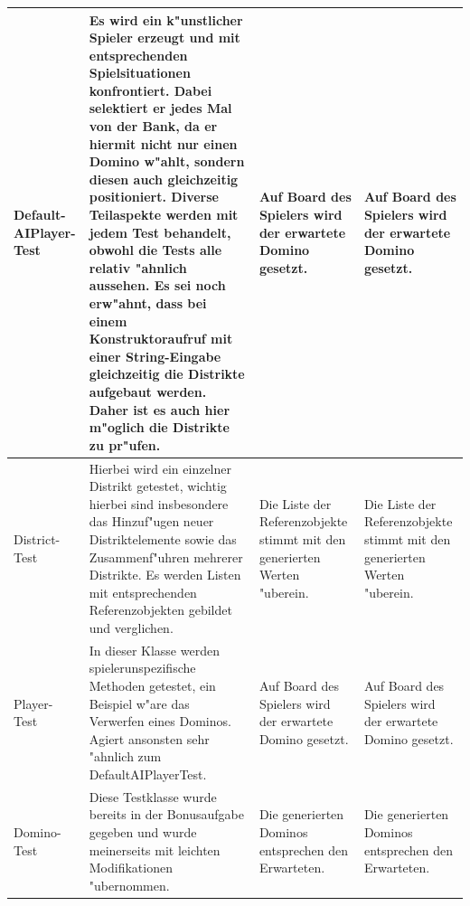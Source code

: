 \begin{longtable}{|p{1.5cm}|p{7.5cm}|p{2cm}|p{2cm}|}
 	\hline 
	
	Default- \newline AIPlayer- \newline Test
	& Es wird ein k"unstlicher Spieler erzeugt und mit entsprechenden Spielsituationen konfrontiert. Dabei selektiert er jedes Mal von der Bank, da er hiermit nicht nur einen Domino w"ahlt, sondern diesen auch gleichzeitig positioniert. Diverse Teilaspekte werden mit jedem Test behandelt, obwohl die Tests alle relativ "ahnlich aussehen. Es sei noch erw"ahnt, dass bei einem Konstruktoraufruf mit einer String-Eingabe gleichzeitig die Distrikte aufgebaut werden. Daher ist es auch hier m"oglich die Distrikte zu pr"ufen. 
	& Auf Board des Spielers wird der erwartete Domino gesetzt. 
	& Auf Board des Spielers wird der erwartete Domino gesetzt. \\
	
	\hline 
 	
 	District- \newline Test
	& Hierbei wird ein einzelner Distrikt getestet, wichtig hierbei sind insbesondere das Hinzuf"ugen neuer Distriktelemente sowie das Zusammenf"uhren mehrerer Distrikte. Es werden Listen mit entsprechenden Referenzobjekten gebildet und verglichen. 
	& Die Liste der Referenzobjekte stimmt mit den generierten Werten "uberein. 
	& Die Liste der Referenzobjekte stimmt mit den generierten Werten "uberein. \\
	
	\hline 
 	
	Player- \newline Test
	& In dieser Klasse werden spielerunspezifische Methoden getestet, ein Beispiel w"are das Verwerfen eines Dominos. Agiert ansonsten sehr "ahnlich zum DefaultAIPlayerTest. 
	& Auf Board des Spielers wird der erwartete Domino gesetzt. 
	& Auf Board des Spielers wird der erwartete Domino gesetzt. \\
	
	\hline 
	
	Domino- \newline Test
	& Diese Testklasse wurde bereits in der Bonusaufgabe gegeben und wurde meinerseits mit leichten Modifikationen "ubernommen. 
	& Die generierten Dominos entsprechen den Erwarteten. 
	& Die generierten Dominos entsprechen den Erwarteten. \\
 	
	\hline
	
\end{longtable}

